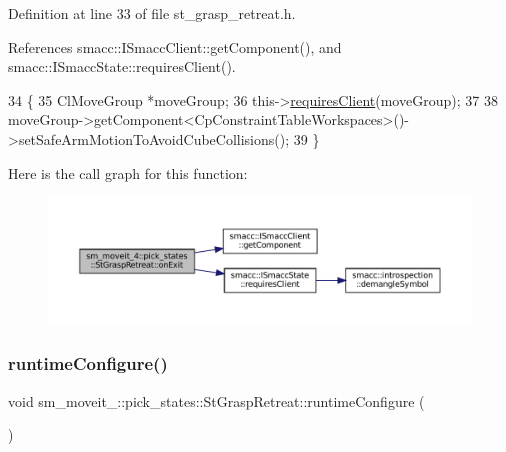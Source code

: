 Definition at line 33 of file st\+\_\+grasp\+\_\+retreat.\+h.



References smacc\+::\+I\+Smacc\+Client\+::get\+Component(), and smacc\+::\+I\+Smacc\+State\+::requires\+Client().


\begin{DoxyCode}
34     \{
35         ClMoveGroup *moveGroup;
36         this->\hyperlink{classsmacc_1_1ISmaccState_a7f95c9f0a6ea2d6f18d1aec0519de4ac}{requiresClient}(moveGroup);
37         
38         moveGroup->getComponent<CpConstraintTableWorkspaces>()->setSafeArmMotionToAvoidCubeCollisions();
39     \}
\end{DoxyCode}
Here is the call graph for this function\+:
\nopagebreak
\begin{figure}[H]
\begin{center}
\leavevmode
\includegraphics[width=350pt]{structsm__moveit__4_1_1pick__states_1_1StGraspRetreat_aba04f694c6c7c664a0c6a6e10c8ce0f1_cgraph}
\end{center}
\end{figure}
\mbox{\label{structsm__moveit__4_1_1pick__states_1_1StGraspRetreat_a2d386f511e377a4b0eb8193cd24ddb84}} 
\subsubsection{\texorpdfstring{runtime\+Configure()}{runtimeConfigure()}}
{\footnotesize\ttfamily void sm\+\_\+moveit\+\_\+::pick\+\_\+states\+::\+St\+Grasp\+Retreat\+::runtime\+Configure (\begin{DoxyParamCaption}{ }\end{DoxyParamCaption})\hspace{0.3cm}{\ttfamily [inline]}}



